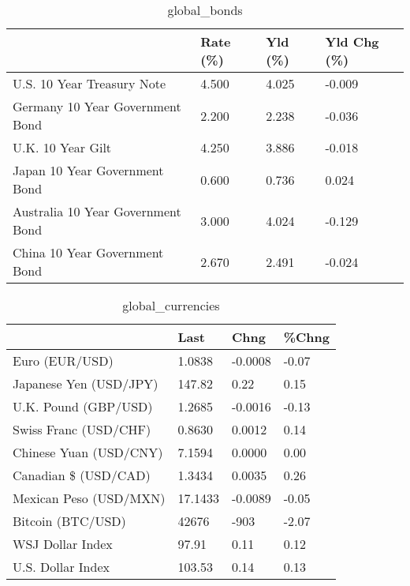 \documentclass{article}%
\begin{document}
%


\begin{table}[htbp]%
\caption{global\_bonds}%
\centering%
\begin{adjustbox}{width=1\textwidth}%
\begin{tabular}{llll}
\toprule
                                  & Rate (\%) & Yld (\%) & Yld Chg (\%) \\
\midrule
       U.S. 10 Year Treasury Note &    4.500 &   4.025 &      -0.009 \\
  Germany 10 Year Government Bond &    2.200 &   2.238 &      -0.036 \\
                U.K. 10 Year Gilt &    4.250 &   3.886 &      -0.018 \\
    Japan 10 Year Government Bond &    0.600 &   0.736 &       0.024 \\
Australia 10 Year Government Bond &    3.000 &   4.024 &      -0.129 \\
    China 10 Year Government Bond &    2.670 &   2.491 &      -0.024 \\
\bottomrule
\end{tabular}
%
\end{adjustbox}%
\end{table}

%


\begin{table}[htbp]%
\caption{global\_currencies}%
\centering%
\begin{adjustbox}{width=1\textwidth}%
\begin{tabular}{llll}
\toprule
                       &    Last &    Chng & \%Chng \\
\midrule
        Euro (EUR/USD) &  1.0838 & -0.0008 & -0.07 \\
Japanese Yen (USD/JPY) &  147.82 &    0.22 &  0.15 \\
  U.K. Pound (GBP/USD) &  1.2685 & -0.0016 & -0.13 \\
 Swiss Franc (USD/CHF) &  0.8630 &  0.0012 &  0.14 \\
Chinese Yuan (USD/CNY) &  7.1594 &  0.0000 &  0.00 \\
  Canadian \$ (USD/CAD) &  1.3434 &  0.0035 &  0.26 \\
Mexican Peso (USD/MXN) & 17.1433 & -0.0089 & -0.05 \\
     Bitcoin (BTC/USD) &   42676 &    -903 & -2.07 \\
      WSJ Dollar Index &   97.91 &    0.11 &  0.12 \\
     U.S. Dollar Index &  103.53 &    0.14 &  0.13 \\
\bottomrule
\end{tabular}
%
\end{adjustbox}%
\end{table}
\end{document}
